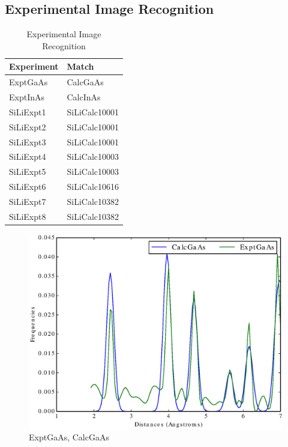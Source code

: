 \documentclass[12pt,letterpaper]{article}
\begin{document}
\subsection{Experimental Image Recognition}
\begin{table}[h]
  \begin{tabular}{|l|l|}
    \hline
    \textbf{Experiment} & \textbf{Match} \\ \hline
    ExptGaAs            & CalcGaAs       \\ \hline
    ExptInAs            & CalcInAs       \\ \hline
    SiLiExpt1           & SiLiCalc10001  \\ \hline
    SiLiExpt2           & SiLiCalc10001  \\ \hline
    SiLiExpt3           & SiLiCalc10001  \\ \hline
    SiLiExpt4           & SiLiCalc10003  \\ \hline
    SiLiExpt5           & SiLiCalc10003  \\ \hline
    SiLiExpt6           & SiLiCalc10616  \\ \hline
    SiLiExpt7           & SiLiCalc10382  \\ \hline
    SiLiExpt8           & SiLiCalc10382  \\ \hline
  \end{tabular}
  \caption{Experimental Image Recognition}
\end{table}

\begin{figure}[ht]
  \begin{center}
    \includegraphics[scale=0.8]{figs/SparseRepExptGaAs-CalcGaAs.eps}
    \caption{ExptGaAs, CalcGaAs}
  \end{center}
\end{figure}
\end{document}

